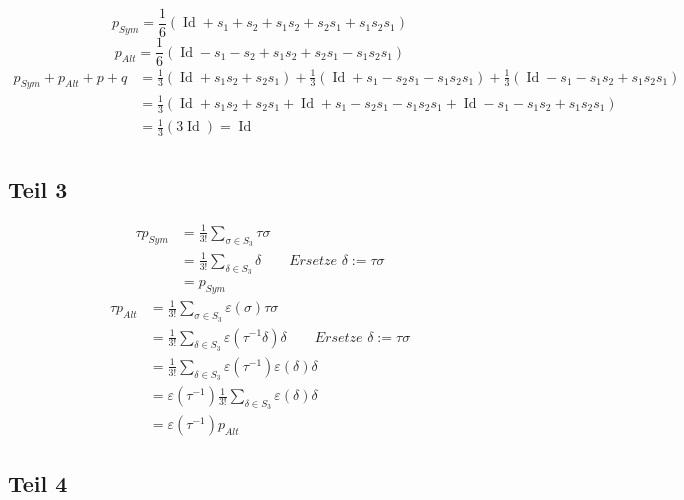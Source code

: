 \documentclass[10pt,a4paper]{article}
\DeclareMathOperator{\id}{Id}
\begin{document}
\begin{equation}
p_{Sym} = \frac{1}{6} ( \id + s_{1} + s_{2} + s_{1}s_{2} + s_{2}s_{1} + s_{1}s_{2}s_{1} )
\end{equation}
\begin{equation}
p_{Alt} = \frac{1}{6} ( \id - s_{1} - s_{2} + s_{1}s_{2} + s_{2}s_{1} - s_{1}s_{2}s_{1} )
\end{equation}
\begin{align*}
p_{Sym} + p_{Alt} + p + q & = \frac{1}{3} (\id + s_{1}s_{2} + s_{2}s_{1}) + \frac{1}{3}(\id + s_{1} - s_{2}s_{1} - s_{1}s_{2}s_{1}) + \frac{1}{3}(\id - s_{1} - s_{1}s_{2} + s_{1}s_{2}s_{1})\\
& = \frac{1}{3} (\id + s_{1}s_{2} + s_{2}s_{1} + \id + s_{1} - s_{2}s_{1} - s_{1}s_{2}s_{1} + \id - s_{1} - s_{1}s_{2} + s_{1}s_{2}s_{1})\\
& = \frac{1}{3} (3\id) = \id\\
\end{align*}

\subsection*{Teil 3}

\begin{align*}
\tau p_{Sym} & = \frac{1}{3!} \sum_{\sigma \in S_{3}} \tau \sigma\\
& = \frac{1}{3!} \sum_{\delta \in S_{3}} \delta \qquad \textit{Ersetze $\delta := \tau \sigma$}\\
& = p_{Sym}
\end{align*}
\begin{align*}
\tau p_{Alt} & = \frac{1}{3!} \sum_{\sigma \in S_{3}} \varepsilon(\sigma) \tau \sigma\\
& = \frac{1}{3!} \sum_{\delta \in S_{3}} \varepsilon(\tau^{-1} \delta) \delta \qquad \textit{Ersetze $\delta := \tau \sigma$}\\
& = \frac{1}{3!} \sum_{\delta \in S_{3}} \varepsilon(\tau^{-1})\varepsilon(\delta) \delta\\
& = \varepsilon(\tau^{-1}) \frac{1}{3!} \sum_{\delta \in S_{3}} \varepsilon(\delta) \delta\\
& = \varepsilon(\tau^{-1}) p_{Alt}
\end{align*}

\subsection*{Teil 4}
\end{document}
